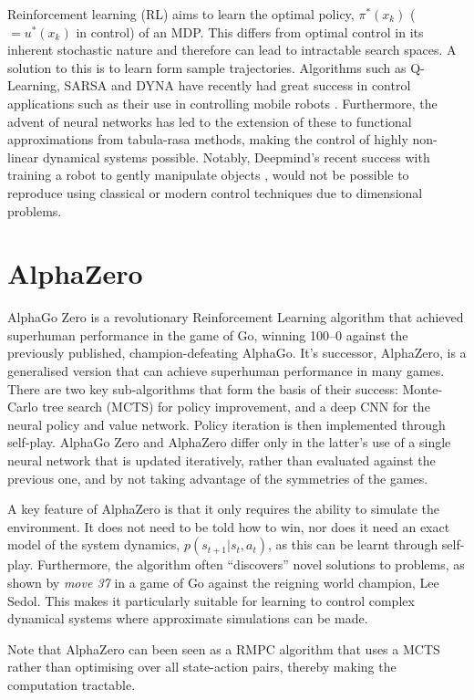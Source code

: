 \documentclass[../main.tex]{subfiles}
\begin{document}
Reinforcement learning (RL) aims to learn the optimal policy, $\pi^{*}(x_k)$ ($=u^{*}(x_k)$ in control) of an MDP. This differs from optimal control in its inherent stochastic nature and therefore can lead to intractable search spaces. A solution to this is to learn form sample trajectories. Algorithms such as Q-Learning, SARSA and DYNA have recently had great success in control applications such as their use in controlling mobile robots \cite{Qlearning, RLoverview}. Furthermore, the advent of neural networks has led to the extension of these to functional approximations from tabula-rasa methods, making the control of highly non-linear dynamical systems possible. Notably, Deepmind's recent success with training a robot to gently manipulate objects \cite{Robothand}, would not be possible to reproduce using classical or modern control techniques due to dimensional problems.

\section{AlphaZero}
AlphaGo Zero is a revolutionary Reinforcement Learning algorithm that achieved superhuman performance in the game of Go, winning 100–0 against the previously published, champion-defeating AlphaGo. It's successor, AlphaZero, is a generalised version that can achieve superhuman performance in many games. There are two key sub-algorithms that form the basis of their success: Monte-Carlo tree search (MCTS) for policy improvement, and a deep CNN for the neural policy and value network. Policy iteration is then implemented through self-play. AlphaGo Zero and AlphaZero differ only in the latter's use of a single neural network that is updated iteratively, rather than evaluated against the previous one, and by not taking advantage of the symmetries of the games.

A key feature of AlphaZero is that it only requires the ability to simulate the environment. It does not need to be told how to win, nor does it need an exact model of the system dynamics, $p(s_{t+1} |s_t, a_t)$, as this can be learnt through self-play. Furthermore, the algorithm often ``discovers'' novel solutions to problems, as shown by \textit{move 37} in a game of Go against the reigning world champion, Lee Sedol. This makes it particularly suitable for learning to control complex dynamical systems where approximate simulations can be made.

Note that AlphaZero can been seen as a RMPC algorithm that uses a MCTS rather than optimising over all state-action pairs, thereby making the computation tractable.
\end{document}
